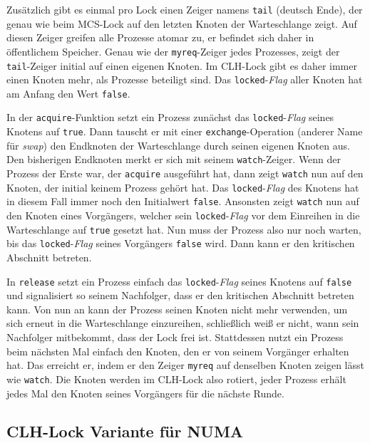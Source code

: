 Zusätzlich gibt es einmal pro Lock einen Zeiger namens \texttt{tail} (deutsch Ende),
der genau wie beim MCS-Lock auf den letzten Knoten der Warteschlange zeigt.
Auf diesen Zeiger greifen alle Prozesse atomar zu,
er befindet sich daher in öffentlichem Speicher.
Genau wie der \texttt{myreq}-Zeiger jedes Prozesses,
zeigt der \texttt{tail}-Zeiger initial auf einen eigenen Knoten.
Im CLH-Lock gibt es daher immer einen Knoten mehr,
als Prozesse beteiligt sind.
Das \texttt{locked}-\textit{Flag} aller Knoten hat am Anfang den Wert \texttt{false}.

In der \texttt{acquire}-Funktion setzt ein Prozess zunächst das \texttt{locked}-\textit{Flag} seines Knotens auf \texttt{true}.
Dann tauscht er mit einer \texttt{exchange}-Operation (anderer Name für \textit{swap})
den Endknoten der Warteschlange durch seinen eigenen Knoten aus.
Den bisherigen Endknoten merkt er sich mit seinem \texttt{watch}-Zeiger.
Wenn der Prozess der Erste war,
der \texttt{acquire} ausgeführt hat,
dann zeigt \texttt{watch} nun auf den Knoten,
der initial keinem Prozess gehört hat.
Das \texttt{locked}-\textit{Flag} des Knotens hat in diesem Fall immer noch den Initialwert \texttt{false}.
Ansonsten zeigt \texttt{watch} nun auf den Knoten eines Vorgängers,
welcher sein \texttt{locked}-\textit{Flag} vor dem Einreihen in die Warteschlange auf \texttt{true} gesetzt hat.
Nun muss der Prozess also nur noch warten,
bis das \texttt{locked}-\textit{Flag} seines Vorgängers \texttt{false} wird.
Dann kann er den kritischen Abschnitt betreten.

In \texttt{release} setzt ein Prozess einfach das \texttt{locked}-\textit{Flag} seines Knotens auf \texttt{false}
und signalisiert so seinem Nachfolger,
dass er den kritischen Abschnitt betreten kann.
Von nun an kann der Prozess seinen Knoten nicht mehr verwenden,
um sich erneut in die Warteschlange einzureihen,
schließlich weiß er nicht,
wann sein Nachfolger mitbekommt,
dass der Lock frei ist.
Stattdessen nutzt ein Prozess beim nächsten Mal einfach den Knoten,
den er von seinem Vorgänger erhalten hat.
Das erreicht er,
indem er den Zeiger \texttt{myreq} auf denselben Knoten zeigen lässt
wie \texttt{watch}.
Die Knoten werden im CLH-Lock also rotiert,
jeder Prozess erhält jedes Mal den Knoten seines Vorgängers für die nächste Runde.

\subsection{CLH-Lock Variante für NUMA}

